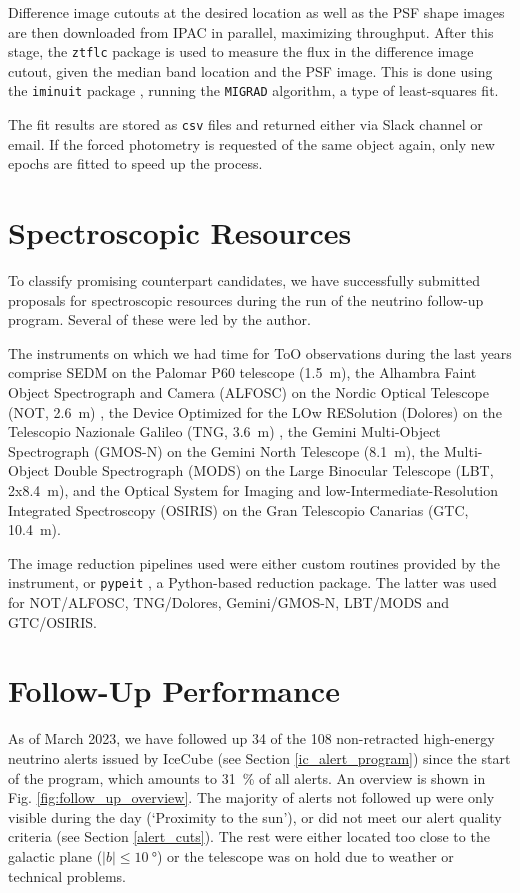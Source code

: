 \documentclass[
    a4paper, %
    fontsize=10pt, %
    twoside=true, %
    numbers=noenddot, %
    fontmethod=tex,
]{kaobook}
\begin{document}
Difference image cutouts at the desired location as well as the PSF shape images are then downloaded from IPAC in parallel, maximizing throughput. After this stage, the \texttt{ztflc} package is used to measure the flux in the difference image cutout, given the median band location and the PSF image. This is done using the \texttt{iminuit} package , running the \texttt{MIGRAD}  algorithm, a type of least-squares fit.

The fit results are stored as \texttt{csv} files and returned either via Slack channel or email. If the forced photometry is requested of the same object again, only new epochs are fitted to speed up the process.

\section{Spectroscopic Resources}
To classify promising counterpart candidates, we have successfully submitted proposals for spectroscopic resources during the run of the neutrino follow-up program. Several of these were led by the author.

The instruments on which we had time for ToO observations during the last years comprise SEDM on the Palomar P60 telescope (\SI{1.5}{\meter}), the Alhambra Faint Object Spectrograph and Camera (ALFOSC) on the Nordic Optical Telescope (NOT, \SI{2.6}{\meter}) , the Device Optimized for the LOw RESolution (Dolores) on the Telescopio Nazionale Galileo (TNG, \SI{3.6}{\meter}) , the Gemini Multi-Object Spectrograph (GMOS-N)  on the Gemini North Telescope (\SI{8.1}{\meter}), the Multi-Object Double Spectrograph (MODS)  on the Large Binocular Telescope (LBT, 2x\SI{8.4}{\meter}), and the Optical System for Imaging and low-Intermediate-Resolution Integrated Spectroscopy (OSIRIS)  on the Gran Telescopio Canarias (GTC, \SI{10.4}{\meter}).

The image reduction pipelines used were either custom routines provided by the instrument, or \texttt{pypeit} , a Python-based reduction package. The latter was used for NOT/ALFOSC, TNG/Dolores, Gemini/GMOS-N, LBT/MODS and GTC/OSIRIS.

\section{Follow-Up Performance}
As of March 2023, we have followed up 34 of the 108 non-retracted high-energy neutrino alerts issued by IceCube (see Section \ref{ic_alert_program}) since the start of the program, which amounts to \SI{31}{\percent} of all alerts. An overview is shown in Fig. \ref{fig:follow_up_overview}. The majority of alerts not followed up were only visible during the day (`Proximity to the sun'), or did not meet our alert quality criteria (see Section \ref{alert_cuts}). The rest were either located too close to the galactic plane ($|b|\leq\SI{10}{\degree}$) or the telescope was on hold due to weather or technical problems.
\end{document}
